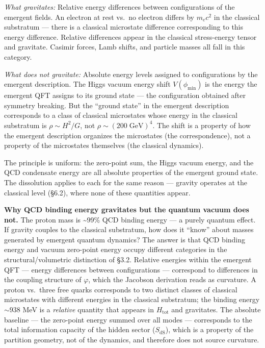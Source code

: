 \documentclass[
]{article}
\begin{document}
\emph{What gravitates:} Relative energy differences between
configurations of the emergent fields. An electron at rest vs.~no
electron differs by \(m_e c^2\) in the classical substratum --- there is
a classical microstate difference corresponding to this energy
difference. Relative differences appear in the classical stress-energy
tensor and gravitate. Casimir forces, Lamb shifts, and particle masses
all fall in this category.

\emph{What does not gravitate:} Absolute energy levels assigned to
configurations by the emergent description. The Higgs vacuum energy
shift \(V(\phi_{\text{min}})\) is the energy the emergent QFT assigns to
its ground state --- the configuration obtained after symmetry breaking.
But the ``ground state'' in the emergent description corresponds to a
class of classical microstates whose energy in the classical substratum
is \(\rho \sim H^2/G\), not \(\rho \sim (200\;\text{GeV})^4\). The shift
is a property of how the emergent description organizes the microstates
(the correspondence), not a property of the microstates themselves (the
classical dynamics).

The principle is uniform: the zero-point sum, the Higgs vacuum energy,
and the QCD condensate energy are all absolute properties of the
emergent ground state. The dissolution applies to each for the same
reason --- gravity operates at the classical level (§6.2), where none of
these quantities appear.

\textbf{Why QCD binding energy gravitates but the quantum vacuum does
not.} The proton mass is \textasciitilde99\% QCD binding energy --- a
purely quantum effect. If gravity couples to the classical substratum,
how does it ``know'' about masses generated by emergent quantum
dynamics? The answer is that QCD binding energy and vacuum zero-point
energy occupy different categories in the structural/volumetric
distinction of §3.2. Relative energies within the emergent QFT ---
energy differences between configurations --- correspond to differences
in the coupling structure of \(\varphi\), which the Jacobson derivation
reads as curvature. A proton vs.~three free quarks corresponds to two
distinct classes of classical microstates with different energies in the
classical substratum; the binding energy \(\sim 938\) MeV is a
\emph{relative} quantity that appears in \(H_{\text{tot}}\) and
gravitates. The absolute baseline --- the zero-point energy summed over
all modes --- corresponds to the total information capacity of the
hidden sector (\(S_{\text{dS}}\)), which is a property of the partition
geometry, not of the dynamics, and therefore does not source curvature.
\end{document}
